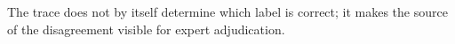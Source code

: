 %
%
%
%


%


%

The trace does not by itself determine which label is correct; it makes
the source of the disagreement visible for expert adjudication.


%

